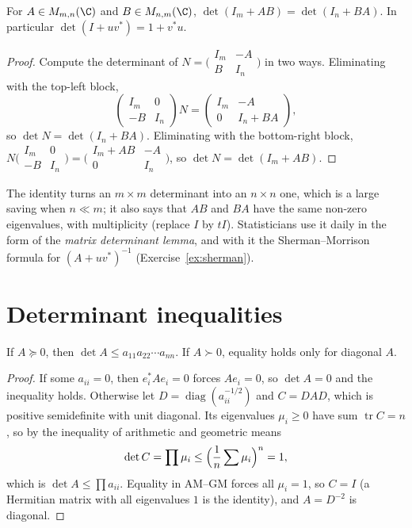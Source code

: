 \begin{proposition}\label{prop:detIAB}
For $A\in M_{m,n}(\C)$ and $B\in M_{n,m}(\C)$, $\det(I_m+AB)=\det(I_n+BA)$. In particular $\det(I+uv^*)=1+v^*u$.
\end{proposition}
\begin{proof}
Compute the determinant of $N=\bigl(\begin{smallmatrix}I_m&-A\\B&I_n\end{smallmatrix}\bigr)$ in two ways. Eliminating with the top-left block,
\[
\begin{pmatrix}I_m&0\\-B&I_n\end{pmatrix}N=\begin{pmatrix}I_m&-A\\0&I_n+BA\end{pmatrix},
\]
so $\det N=\det(I_n+BA)$. Eliminating with the bottom-right block, $N\bigl(\begin{smallmatrix}I_m&0\\-B&I_n\end{smallmatrix}\bigr)=
\bigl(\begin{smallmatrix}I_m+AB&-A\\0&I_n\end{smallmatrix}\bigr)$, so $\det N=\det(I_m+AB)$.
\end{proof}

The identity turns an $m\times m$ determinant into an $n\times n$ one, which is a large saving when $n\ll m$; it also says that $AB$ and
$BA$ have the same non-zero eigenvalues, with multiplicity (replace $I$ by $tI$). Statisticians use it daily in the form of the
\emph{matrix determinant lemma}, and with it the Sherman--Morrison formula for $(A+uv^*)^{-1}$ (Exercise~\ref{ex:sherman}).

\section{Determinant inequalities}

\begin{theorem}\label{thm:hadamard}
If $A\succeq0$, then $\det A\le a_{11}a_{22}\cdots a_{nn}$. If $A\succ0$, equality holds only for diagonal $A$.
\end{theorem}
\begin{proof}
If some $a_{ii}=0$, then $e_i^*Ae_i=0$ forces $Ae_i=0$, so $\det A=0$ and the inequality holds. Otherwise let $D=\operatorname{diag}(a_{ii}^
{-1/2})$ and $C=DAD$, which is positive semidefinite with unit diagonal. Its eigenvalues $\mu_i\ge0$ have sum $\operatorname{tr}C=n$,
so by the inequality of arithmetic and geometric means
\[
\det C=\prod\mu_i\le\Bigl(\frac1n\sum\mu_i\Bigr)^n=1,
\]
which is $\det A\le\prod a_{ii}$. Equality in AM--GM forces all $\mu_i=1$, so $C=I$ (a Hermitian matrix with all eigenvalues $1$ is
the identity), and $A=D^{-2}$ is diagonal.
\end{proof}

